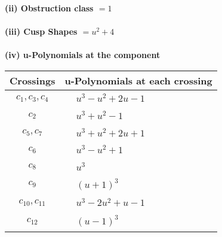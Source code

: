 \documentclass[1p]{elsarticle_modified}
\theoremstyle{definition}
\begin{document}
\flushleft \textbf{(ii) Obstruction class $= 1$}\\~\\
\flushleft \textbf{(iii) Cusp Shapes $= u^2+4$}\\~\\
\newpage\renewcommand{\arraystretch}{1}
\flushleft \textbf{(iv) u-Polynomials at the component}\newline \\
\begin{tabular}{m{50pt}|m{274pt}}
Crossings & \hspace{64pt}u-Polynomials at each crossing \\
\hline $$\begin{aligned}c_{1},c_{3},c_{4}\end{aligned}$$&$\begin{aligned}
&u^3- u^2+2 u-1
\end{aligned}$\\
\hline $$\begin{aligned}c_{2}\end{aligned}$$&$\begin{aligned}
&u^3+u^2-1
\end{aligned}$\\
\hline $$\begin{aligned}c_{5},c_{7}\end{aligned}$$&$\begin{aligned}
&u^3+u^2+2 u+1
\end{aligned}$\\
\hline $$\begin{aligned}c_{6}\end{aligned}$$&$\begin{aligned}
&u^3- u^2+1
\end{aligned}$\\
\hline $$\begin{aligned}c_{8}\end{aligned}$$&$\begin{aligned}
&u^3
\end{aligned}$\\
\hline $$\begin{aligned}c_{9}\end{aligned}$$&$\begin{aligned}
&(u+1)^3
\end{aligned}$\\
\hline $$\begin{aligned}c_{10},c_{11}\end{aligned}$$&$\begin{aligned}
&u^3-2 u^2+u-1
\end{aligned}$\\
\hline $$\begin{aligned}c_{12}\end{aligned}$$&$\begin{aligned}
&(u-1)^3
\end{aligned}$\\
\hline
\end{tabular}\\~\\
\end{document}
